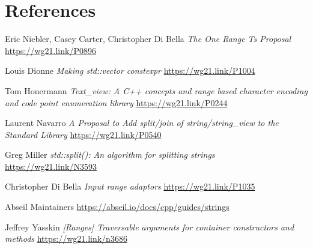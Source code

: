 \documentclass{wg21}
\begin{document}
\section{References}
\renewcommand{\section}[2]{}%
\begin{thebibliography}{9}

    Eric Niebler, Casey Carter, Christopher Di Bella
    \emph{The One Range Ts Proposal}\newline
    \url{https://wg21.link/P0896}

	Louis Dionne
	\emph{Making std::vector constexpr}\newline
	\url{https://wg21.link/P1004}
	
	Tom Honermann
	\emph{Text_view: A C++ concepts and range based character encoding and code point enumeration library}\newline
	\url{https://wg21.link/P0244}

	Laurent Navarro
	\emph{A Proposal to Add split/join of string/string_view to the Standard Library}\newline
	\url{https://wg21.link/P0540}

	Greg Miller
	\emph{std::split(): An algorithm for splitting strings}\newline
	\url{https://wg21.link/N3593}	
	
	Christopher Di Bella
	\emph{Input range adaptors}\newline
	\url{https://wg21.link/P1035}

	Abseil Maintainers
	\url{https://abseil.io/docs/cpp/guides/strings}
	
	Jeffrey Yasskin
	\emph{[Ranges] Traversable arguments for container constructors and methods}\newline
	\url{https://wg21.link/n3686}

\end{thebibliography}
\end{document}
